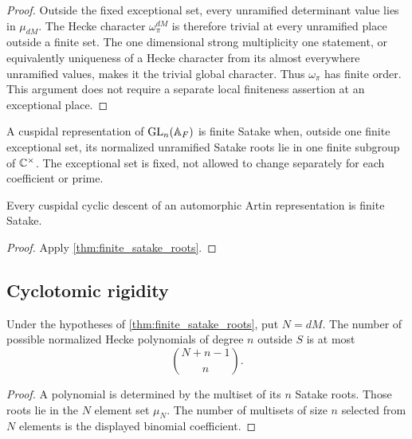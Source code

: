 \begin{proof}
Outside the fixed exceptional set, every unramified determinant value lies in \(\mu_{dM}\). The Hecke character \(\omega_\pi^{dM}\) is therefore trivial at every unramified place outside a finite set. The one dimensional strong multiplicity one statement, or equivalently uniqueness of a Hecke character from its almost everywhere unramified values, makes it the trivial global character. Thus \(\omega_\pi\) has finite order. This argument does not require a separate local finiteness assertion at an exceptional place.
\end{proof}

\begin{definition}\label{def:finite_satake_cusp}
A cuspidal representation of \(\operatorname{GL}_n(\mathbb A_F)\) is finite Satake when, outside one finite exceptional set, its normalized unramified Satake roots lie in one finite subgroup of \(\mathbb C^\times\). The exceptional set is fixed, not allowed to change separately for each coefficient or prime.
\end{definition}

\begin{corollary}\label{cor:cyclic_finite_satake}
Every cuspidal cyclic descent of an automorphic Artin representation is finite Satake.
\end{corollary}

\begin{proof}
Apply \cref{thm:finite_satake_roots}.
\end{proof}


\subsection{Cyclotomic rigidity}

\begin{proposition}\label{prop:finite_number_hecke}
Under the hypotheses of \cref{thm:finite_satake_roots}, put \(N=dM\). The number of possible normalized Hecke polynomials of degree \(n\) outside \(S\) is at most
\[
 \boxed{
 \binom{N+n-1}{n}.
 }
\]
\end{proposition}

\begin{proof}
A polynomial is determined by the multiset of its \(n\) Satake roots. Those roots lie in the \(N\) element set \(\mu_N\). The number of multisets of size \(n\) selected from \(N\) elements is the displayed binomial coefficient.
\end{proof}

